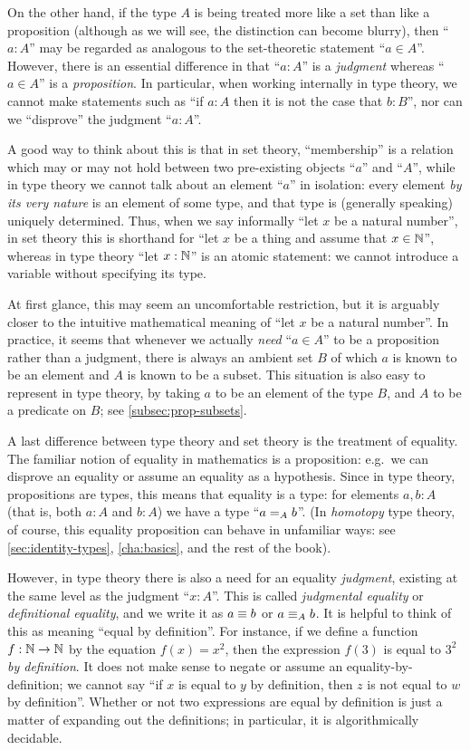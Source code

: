 On the other hand, if the type $A$ is being treated more like a set than like a proposition (although as we will see, the distinction can become blurry), then ``$a:A$'' may be regarded as analogous to the set-theoretic statement ``$a\in A$''.
However, there is an essential difference in that ``$a:A$'' is a \emph{judgment} whereas ``$a\in A$'' is a \emph{proposition}.
In particular, when working internally in type theory, we cannot make statements such as ``if $a:A$ then it is not the case that $b:B$'', nor can we ``disprove'' the judgment ``$a:A$''.

A good way to think about this is that in set theory, ``membership'' is a relation which may or may not hold between two pre-existing objects ``$a$'' and ``$A$'', while in type theory we cannot talk about an element ``$a$'' in isolation: every element \emph{by its very nature} is an element of some type, and that type is (generally speaking) uniquely determined.
Thus, when we say informally ``let $x$ be a natural number'', in set theory this is shorthand for ``let $x$ be a thing and assume that $x\in\nat$'', whereas in type theory ``let $x:\nat$'' is an atomic statement: we cannot introduce a variable without specifying its type.

At first glance, this may seem an uncomfortable restriction, but it is arguably closer to the intuitive mathematical meaning of ``let $x$ be a natural number''.
In practice, it seems that whenever we actually \emph{need} ``$a\in A$'' to be a proposition rather than a judgment, there is always an ambient set $B$ of which $a$ is known to be an element and $A$ is known to be a subset.
This situation is also easy to represent in type theory, by taking $a$ to be an element of the type $B$, and $A$ to be a predicate on $B$; see \autoref{subsec:prop-subsets}.

A last difference between type theory and set theory is the treatment of equality.
The familiar notion of equality in mathematics is a proposition: e.g.\ we can disprove an equality or assume an equality as a hypothesis.
Since in type theory, propositions are types, this means that equality is a type: for elements $a,b:A$ (that is, both $a:A$ and $b:A$) we have a type ``$\id[A]ab$''.
(In \emph{homotopy} type theory, of course, this equality proposition can behave in unfamiliar ways: see \autoref{sec:identity-types}, \autoref{cha:basics}, and the rest of the book).

However, in type theory there is also a need for an equality \emph{judgment}, existing at the same level as the judgment ``$x:A$''.
This is called \emph{judgmental equality} or \emph{definitional equality}, and we write it as $a\jdeq b$ or $a \jdeq_A b$.
It is helpful to think of this as meaning ``equal by definition''.
For instance, if we define a function $f:\nat\to\nat$ by the equation $f(x)=x^2$, then the expression $f(3)$ is equal to $3^2$ \emph{by definition}.
It does not make sense to negate or assume an equality-by-definition; we cannot say ``if $x$ is equal to $y$ by definition, then $z$ is not equal to $w$ by definition''.
Whether or not two expressions are equal by definition is just a matter of expanding out the definitions; in particular, it is algorithmically decidable.


